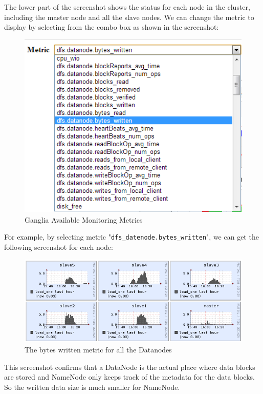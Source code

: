 The lower part of the screenshot shows the status for each node in the cluster, including the master node and all the slave nodes. We can change the metric to display by selecting from the combo box as shown in the screenshot:
\begin{figure}[ht]
  \centering
  \includegraphics[width=.8\textwidth]{figs/5163os_06_09.png}
  \caption{Ganglia Available Monitoring Metrics}\label{fig:ganglia.metrics}
\end{figure} 
For example, by selecting metric "\verb|dfs_datenode.bytes_written|", we can get the following screenshot for each node:
\begin{figure}[ht]
  \centering
  \includegraphics[width=.8\textwidth]{figs/5163os_06_10.png}
  \caption{The bytes written metric for all the Datanodes}\label{fig:bytes.written.metric}
\end{figure} 
This screenshot confirms that a DataNode is the actual place where data blocks are stored and NameNode only keeps track of the metadata for the data blocks. So the written data size is much smaller for NameNode.

